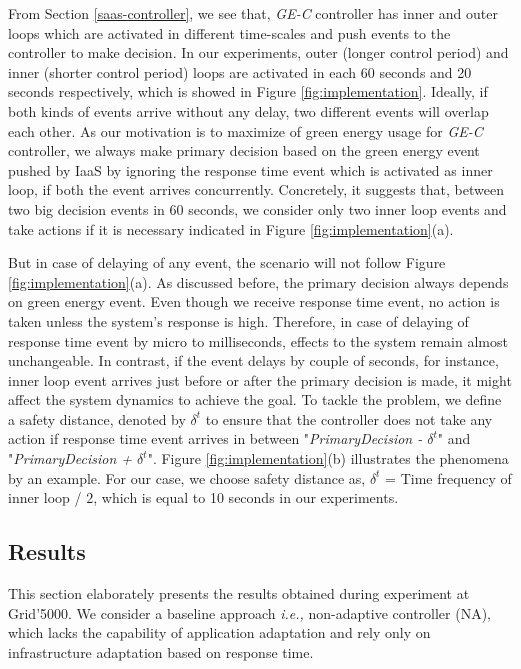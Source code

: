 From Section \ref{saas-controller}, we see that, \emph{GE-C} controller has inner and outer loops which are activated in different time-scales and push events to the controller to make decision. In our experiments, outer (longer control period) and inner (shorter control period) loops are activated in each 60 seconds and 20 seconds respectively, which is showed in Figure \ref{fig:implementation}. Ideally, if both kinds of events arrive without any delay, two different events will overlap each other. As our motivation is to maximize of green energy usage for \emph{GE-C} controller, we always make primary decision based on the green energy event pushed by IaaS by ignoring the response time event which is activated as inner loop, if both the event arrives concurrently. Concretely, it suggests that, between two big decision events in 60 seconds, we consider only two inner loop events and take actions if it is necessary indicated in Figure \ref{fig:implementation}(a).

But in case of delaying of any event, the scenario will not follow Figure \ref{fig:implementation}(a). As discussed before, the primary decision always depends on green energy event. Even though we receive response time event, no action is taken unless the system's response is high. Therefore, in case of delaying of response time event by micro to milliseconds, effects to the system remain almost unchangeable. In contrast, if the event delays by couple of seconds, for instance, inner loop event arrives just before or after the primary decision is made, it might affect the system dynamics to achieve the goal. To tackle the problem, we define a safety distance, denoted by $\delta^t$ to ensure that the controller does not take any action if response time event arrives in between "\textit{PrimaryDecision - $\delta^t$}" and "\textit{PrimaryDecision + $\delta^t$}". Figure \ref{fig:implementation}(b) illustrates the phenomena by an example. For our case, we choose safety distance as, $\delta^t$ = Time frequency of inner loop / $2$, which is equal to 10 seconds in our experiments.



\subsection{Results}

This section elaborately presents the results obtained during experiment at Grid'5000. We consider a baseline approach \emph{i.e.,} non-adaptive controller (NA), which lacks the capability of application adaptation and rely only on infrastructure adaptation based on response time.


